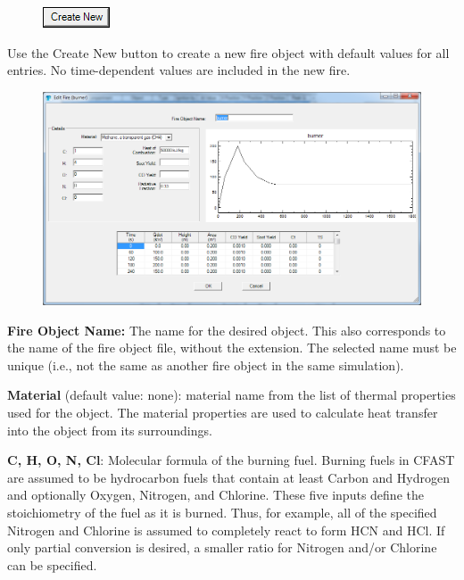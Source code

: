 \begin{figure}
  \includegraphics[width=0.781in]{FIGURES/Input_File/Create_New_Button}
\end{figure}

Use the Create New button to create a new fire object with default values for all entries.  No time-dependent values are included in the new fire.

\begin{figure}[h!]
\begin{center}
\includegraphics[width=6.5in]{FIGURES/Input_File/Fire_Object_Edit}
\end{center}
\end{figure}

\textbf{Fire Object Name:} The name for the desired object.  This also corresponds to the name of the fire object file, without the extension. The selected name must be unique (i.e., not the same as another fire object in the same simulation).

\textbf{Material} (default value: none): material name from the list of thermal properties used for the object. The material properties are used to calculate heat transfer into the object from its surroundings.

\textbf{C, H, O, N, Cl}: Molecular formula of the burning fuel. Burning fuels in CFAST are assumed to be hydrocarbon fuels that contain at least Carbon and Hydrogen and optionally Oxygen, Nitrogen, and Chlorine. These five inputs define the stoichiometry of the fuel as it is burned.  Thus, for example, all of the specified Nitrogen and Chlorine is assumed to completely react to form HCN and HCl.  If only partial conversion is desired, a smaller ratio for Nitrogen and/or Chlorine can be specified.

